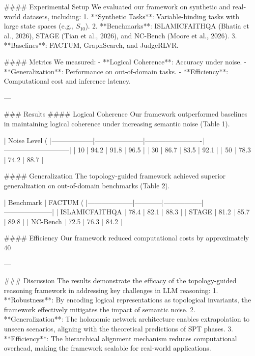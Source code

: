 #### Experimental Setup
We evaluated our framework on synthetic and real-world datasets, including:
1. **Synthetic Tasks**: Variable-binding tasks with large state spaces (e.g., \( S_{10} \)).
2. **Benchmarks**: ISLAMICFAITHQA (Bhatia et al., 2026), STAGE (Tian et al., 2026), and NC-Bench (Moore et al., 2026).
3. **Baselines**: FACTUM, GraphSearch, and JudgeRLVR.

#### Metrics
We measured:
- **Logical Coherence**: Accuracy under noise.
- **Generalization**: Performance on out-of-domain tasks.
- **Efficiency**: Computational cost and inference latency.

---

### Results
#### Logical Coherence
Our framework outperformed baselines in maintaining logical coherence under increasing semantic noise (Table 1).

| Noise Level (%
|------------------|---------------------|-------------------------|-----------------------------|
| 10              | 94.2               | 91.8                   | 96.5                       |
| 30              | 86.7               | 83.5                   | 92.1                       |
| 50              | 78.3               | 74.2                   | 88.7                       |

#### Generalization
The topology-guided framework achieved superior generalization on out-of-domain benchmarks (Table 2).

| Benchmark         | FACTUM (%
|--------------------|------------|-----------------|---------------------|
| ISLAMICFAITHQA    | 78.4       | 82.1            | 88.3                |
| STAGE             | 81.2       | 85.7            | 89.8                |
| NC-Bench          | 72.5       | 76.3            | 84.2                |

#### Efficiency
Our framework reduced computational costs by approximately 40%

---

### Discussion
The results demonstrate the efficacy of the topology-guided reasoning framework in addressing key challenges in LLM reasoning:
1. **Robustness**: By encoding logical representations as topological invariants, the framework effectively mitigates the impact of semantic noise.
2. **Generalization**: The holonomic network architecture enables extrapolation to unseen scenarios, aligning with the theoretical predictions of SPT phases.
3. **Efficiency**: The hierarchical alignment mechanism reduces computational overhead, making the framework scalable for real-world applications.

